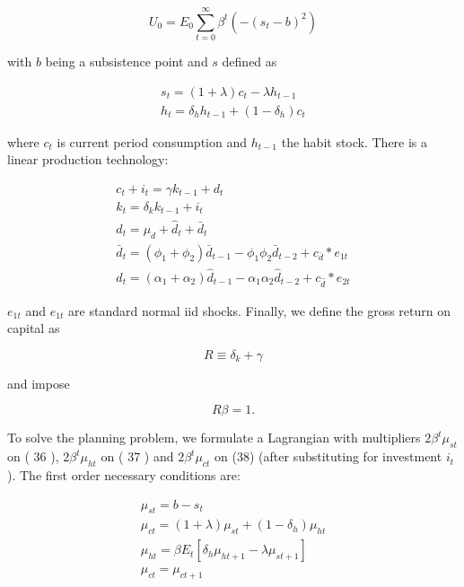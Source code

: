 \documentclass[10pt]{article}
\begin{document}
\begin{equation*}
U_{0}=E_{0} \sum_{t=0}^{\infty} \beta^{t}\left(-\left(s_{t}-b\right)^{2}\right) \tag{35}
\end{equation*}


with $b$ being a subsistence point and $s$ defined as

\[
\begin{array}{r}
s_{t}=(1+\lambda) c_{t}-\lambda h_{t-1} \\
h_{t}=\delta_{h} h_{t-1}+\left(1-\delta_{h}\right) c_{t} \tag{37}
\end{array}
\]

where $c_{t}$ is current period consumption and $h_{t-1}$ the habit stock. There is a linear production technology:

\[
\begin{array}{r}
c_{t}+i_{t}=\gamma k_{t-1}+d_{t} \\
k_{t}=\delta_{k} k_{t-1}+i_{t} \\
d_{t}=\mu_{d}+\hat{d}_{t}+\bar{d}_{t} \\
\bar{d}_{t}=\left(\phi_{1}+\phi_{2}\right) \bar{d}_{t-1}-\phi_{1} \phi_{2} \bar{d}_{t-2}+c_{\bar{d}} * e_{1 t} \\
\hat{d}_{t}=\left(\alpha_{1}+\alpha_{2}\right) \hat{d}_{t-1}-\alpha_{1} \alpha_{2} \hat{d}_{t-2}+c_{\hat{d}} * e_{2 t} \tag{42}
\end{array}
\]

$e_{1 t}$ and $e_{1 t}$ are standard normal iid shocks. Finally, we define the gross return on capital as


\begin{equation*}
R \equiv \delta_{k}+\gamma \tag{43}
\end{equation*}


and impose


\begin{equation*}
R \beta=1 . \tag{44}
\end{equation*}


To solve the planning problem, we formulate a Lagrangian with multipliers $2 \beta^{t} \mu_{s t}$ on ( 36 ), $2 \beta^{t} \mu_{h t}$ on ( 37 ) and $2 \beta^{t} \mu_{c t}$ on (38) (after substituting for investment $i_{t}$ ). The first order necessary conditions are:

\[
\begin{array}{r}
\mu_{s t}=b-s_{t} \\
\mu_{c t}=(1+\lambda) \mu_{s t}+\left(1-\delta_{h}\right) \mu_{h t} \\
\mu_{h t}=\beta E_{t}\left[\delta_{h} \mu_{h t+1}-\lambda \mu_{s t+1}\right] \\
\mu_{c t}=\mu_{c t+1} \tag{48}
\end{array}
\]
\end{document}

